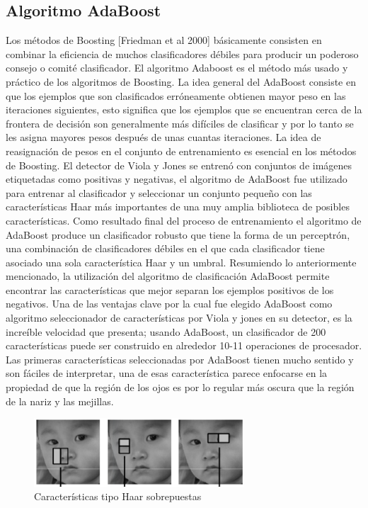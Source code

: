    \subsection{Algoritmo AdaBoost}
   Los métodos de Boosting [Friedman et al 2000] básicamente consisten en combinar la eficiencia de muchos clasificadores débiles para producir un poderoso consejo o comité clasificador. El algoritmo Adaboost es el método más usado y práctico de los algoritmos de Boosting. La idea general del AdaBoost consiste en que los ejemplos que son clasificados erróneamente obtienen mayor peso en las iteraciones siguientes, esto significa que los ejemplos que se encuentran cerca de la frontera de decisión son generalmente más difíciles de clasificar y por lo tanto se les asigna mayores pesos después de unas cuantas iteraciones. La idea de reasignación de pesos en el conjunto de entrenamiento es esencial en los métodos de Boosting.
   El detector de Viola y Jones se entrenó con conjuntos de imágenes etiquetadas como positivas y negativas, el algoritmo de AdaBoost fue utilizado para entrenar al clasificador y seleccionar un conjunto pequeño con las características Haar más importantes de una muy amplia biblioteca de posibles características. Como resultado final del proceso de entrenamiento el algoritmo de AdaBoost produce un clasificador robusto que tiene la forma de un perceptrón, una combinación de clasificadores débiles en el que cada clasificador tiene asociado una sola característica Haar y un umbral. Resumiendo lo anteriormente mencionado, la utilización del algoritmo de clasificación AdaBoost permite encontrar las características que mejor separan los ejemplos positivos de los negativos. Una de las ventajas clave por la cual fue elegido AdaBoost como algoritmo seleccionador de características por Viola y jones en su detector, es la increíble velocidad que presenta; usando AdaBoost, un clasificador de 200 características puede ser construido en alrededor 10-11 operaciones de procesador. Las primeras características seleccionadas por AdaBoost tienen mucho sentido y son fáciles de interpretar, una de esas característica parece enfocarse en la propiedad de que la región de los ojos es por lo regular más oscura que la región de la nariz y las mejillas.
   \begin{figure}[htbp]
   	\centering
   	\includegraphics[width=0.7\textwidth]{./pictures/adaboost}
   	\caption{Características tipo Haar sobrepuestas}\label{fig: figura}
   \end{figure}
   
